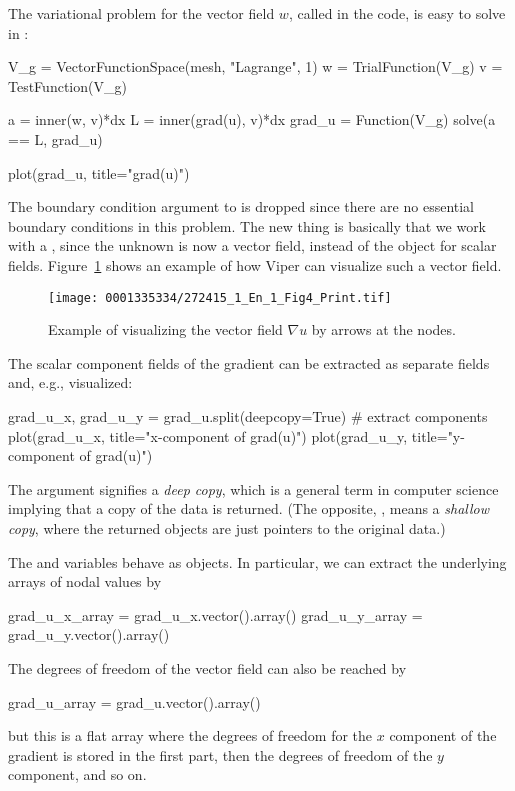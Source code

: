 The variational problem for the vector field $w$, called 
in the code, is easy to solve in \fenics:
\begin{python}
V_g = VectorFunctionSpace(mesh, "Lagrange", 1)
w = TrialFunction(V_g)
v = TestFunction(V_g)

a = inner(w, v)*dx
L = inner(grad(u), v)*dx
grad_u = Function(V_g)
solve(a == L, grad_u)

plot(grad_u, title="grad(u)")
\end{python}
The boundary condition argument to  is dropped since there are
no essential boundary conditions in this problem.
The new thing is basically that we work with a
, since the unknown is now a vector
field, instead of the  object for scalar fields.
Figure~\ref{langtangen:poisson:2D:fig:ex1:gradu} shows an example of how Viper
can visualize such a vector field.

\begin{figure}[!t]
  \centering
  \texttt{[image: 0001335334/272415\_1\_En\_1\_Fig4\_Print.tif]}
  \caption{Example of visualizing the vector field
    $\nabla u$ by arrows at the nodes.}
  \label{langtangen:poisson:2D:fig:ex1:gradu}
\end{figure}

The scalar component fields of the gradient can be extracted as separate
fields and, e.g., visualized:

\begin{python}
grad_u_x, grad_u_y = grad_u.split(deepcopy=True)  # extract components
plot(grad_u_x, title="x-component of grad(u)")
plot(grad_u_y, title="y-component of grad(u)")
\end{python}
The  argument signifies a \emph{deep copy}, which
is a general term in computer science implying that a copy of the data
is returned. (The opposite, , means a \emph{shallow
copy}, where the returned objects are just pointers to the original data.)

The  and  variables behave as 
objects. In particular, we can extract the underlying arrays of nodal
values by
\begin{python}
grad_u_x_array = grad_u_x.vector().array()
grad_u_y_array = grad_u_y.vector().array()
\end{python}
The degrees of freedom of the  vector field can also be
reached by
\begin{python}
grad_u_array = grad_u.vector().array()
\end{python}
but this is a flat  array where the degrees of freedom for
the $x$ component of the gradient is stored in the first part, then the
degrees of freedom of the $y$ component, and so on.

